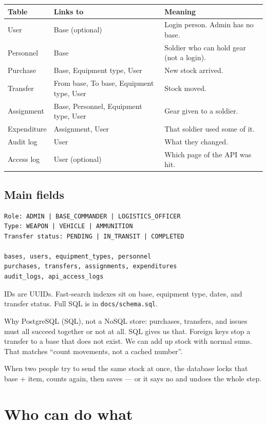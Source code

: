 \documentclass[11pt,a4paper]{article}
\begin{document}
\begin{center}
\begin{tabular}{lll}
\toprule
\textbf{Table} & \textbf{Links to} & \textbf{Meaning} \\
\midrule
User & Base (optional) & Login person. Admin has no base. \\
Personnel & Base & Soldier who can hold gear (not a login). \\
Purchase & Base, Equipment type, User & New stock arrived. \\
Transfer & From base, To base, Equipment type, User & Stock moved. \\
Assignment & Base, Personnel, Equipment type, User & Gear given to a soldier. \\
Expenditure & Assignment, User & That soldier used some of it. \\
Audit log & User & What they changed. \\
Access log & User (optional) & Which page of the API was hit. \\
\bottomrule
\end{tabular}
\end{center}

\subsection{Main fields}

\begin{lstlisting}
Role: ADMIN | BASE_COMMANDER | LOGISTICS_OFFICER
Type: WEAPON | VEHICLE | AMMUNITION
Transfer status: PENDING | IN_TRANSIT | COMPLETED

bases, users, equipment_types, personnel
purchases, transfers, assignments, expenditures
audit_logs, api_access_logs
\end{lstlisting}

IDs are UUIDs. Fast-search indexes sit on base, equipment type, dates, and transfer status. Full SQL is in \texttt{docs/schema.sql}.

Why PostgreSQL (SQL), not a NoSQL store: purchases, transfers, and issues must all succeed together or not at all. SQL gives us that. Foreign keys stop a transfer to a base that does not exist. We can add up stock with normal sums. That matches ``count movements, not a cached number''.

When two people try to send the same stock at once, the database locks that base + item, counts again, then saves --- or it says no and undoes the whole step.

\section{Who can do what}
\end{document}
